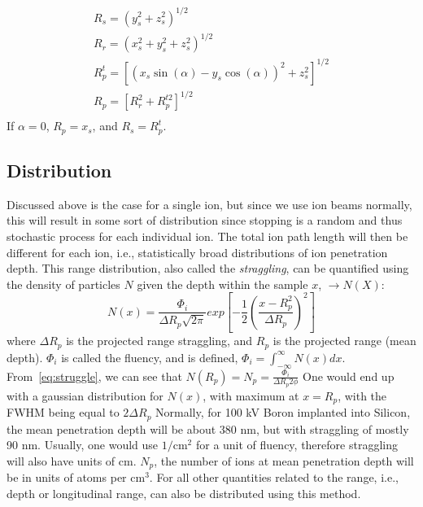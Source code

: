 \begin{gather*}
    R_s = \left( y_s^2 + z_s^2 \right)^{1/2}\\
    R_r = \left( x_s^2 + y_s^2 + z_s^2 \right)^{1/2}\\
    R_p^t = \left[ \left( x_s \sin(\alpha) - y_s\cos(\alpha) \right)^2 + z_s^2 \right] ^{1/2}\\
    R_p = \left[ R_r^2 + R_p^{t2}\right] ^{1/2}\\
\end{gather*}
If $\alpha = 0$, $R_p = x_s$, and $R_s = R_p^t$.
\subsection{Distribution}\label{subsec:distribution}
Discussed above is the case for a single ion, but since we use ion beams normally, this will result in some sort of distribution since stopping is a random and thus stochastic process for each individual ion.
The total ion path length will then be different for each ion, i.e., statistically broad distributions of ion penetration depth.
This range distribution, also called the \textit{straggling}, can be quantified using the density of particles $N$ given the depth within the sample $x$, $\rightarrow N(X)$:
\begin{equation}
	N(x) = \frac{\Phi_i}{\Delta R_p \sqrt{2\pi}} exp \left[ -\frac{1}{2} \left( \frac{x - R_p^2}{\Delta R_p}\right) ^2\right]
	\label{eq:struggle}
\end{equation}
where $\Delta R_p$ is the projected range straggling, and $R_p$ is the projected range (mean depth). $\Phi_i$ is called the fluency, and is defined,  $\Phi_i =  \int_{-\infty}^\infty N(x)dx$.
From~\ref{eq:struggle}, we can see that $N(R_p) = N_p = \frac{\Phi_i}{\Delta R_p 2\phi}$
One would end up with a gaussian distribution for $N(x)$, with maximum at $x = R_p$, with the FWHM being equal to $2 \Delta R_p$
Normally, for 100 kV Boron implanted into Silicon, the mean penetration depth will be about 380 nm, but with straggling of mostly 90 nm.
Usually, one would use $1/$cm$^2$ for a unit of fluency, therefore straggling will also have units of cm.
$N_p$, the number of ions at mean penetration depth will be in units of atoms per cm$^3$.
For all other quantities related to the range, i.e., depth or longitudinal range, can also be distributed using this method.


